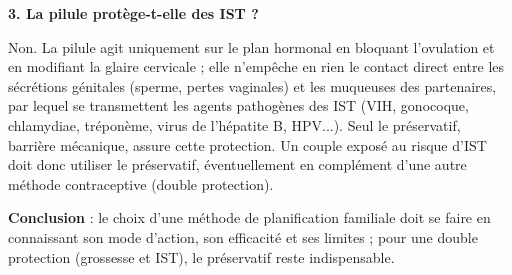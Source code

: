 \documentclass[11pt]{article}
\begin{document}
\begin{exoresolu}
\textbf{3. La pilule protège-t-elle des IST ?}

Non. La pilule agit uniquement sur le plan hormonal en bloquant l'ovulation et en modifiant la glaire cervicale ; elle n'empêche en rien le contact direct entre les sécrétions génitales (sperme, pertes vaginales) et les muqueuses des partenaires, par lequel se transmettent les agents pathogènes des IST (VIH, gonocoque, chlamydiae, tréponème, virus de l'hépatite B, HPV...). Seul le préservatif, barrière mécanique, assure cette protection. Un couple exposé au risque d'IST doit donc utiliser le préservatif, éventuellement en complément d'une autre méthode contraceptive (double protection).

\textbf{Conclusion} : le choix d'une méthode de planification familiale doit se faire en connaissant son mode d'action, son efficacité et ses limites ; pour une double protection (grossesse et IST), le préservatif reste indispensable.
\end{exoresolu}
\end{document}
